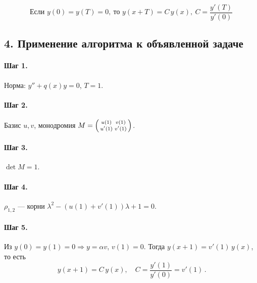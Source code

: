 \[
\boxed{\,\text{Если }y(0)=y(T)=0,\ \text{то }y(x+T)=C\,y(x),\ C=\dfrac{y'(T)}{y'(0)}\,}
\]

\subsection*{4. Применение алгоритма к объявленной задаче}

\paragraph{Шаг 1.} Норма: \(y''+q(x)y=0\), \(T=1\).

\paragraph{Шаг 2.} Базис \(u,v\), монодромия
\(M=\begin{psmallmatrix}u(1)&v(1)\\ u'(1)&v'(1)\end{psmallmatrix}\).

\paragraph{Шаг 3.} \(\det M=1\).

\paragraph{Шаг 4.} \(\rho_{1,2}\) — корни \(\lambda^2-(u(1)+v'(1))\lambda+1=0\).

\paragraph{Шаг 5.} Из \(y(0)=y(1)=0\Rightarrow y=\alpha v\), \(v(1)=0\).
Тогда \(y(x+1)=v'(1)\,y(x)\), то есть
\[
\boxed{\,y(x+1)=C\,y(x),\quad C=\dfrac{y'(1)}{y'(0)}=v'(1)\,}.
\]

